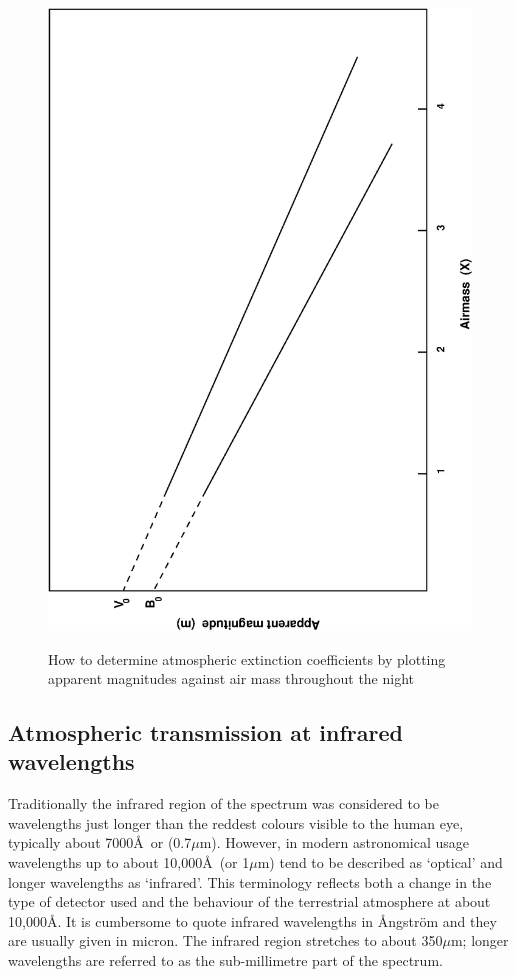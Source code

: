\documentclass[twoside,11pt]{article}
\begin{document}
\begin{figure}[htbp]
   \centering 
   \includegraphics[totalheight=4.5in,angle=270]{sc6_airmass.ps}
   \begin{quote}
   \caption{How to determine atmospheric extinction coefficients by
    plotting apparent magnitudes against air mass throughout the night
   \label{AIRMASSP} }
   \end{quote}
\end{figure}

\subsection{\label{IRATMOS}Atmospheric transmission at infrared wavelengths}

Traditionally the infrared region of the spectrum was considered to be
wavelengths just longer than the reddest colours visible to the human
eye, typically about 7000\AA ~or (0.7$\mu$m).  However, in modern
astronomical usage wavelengths up to about 10,000\AA ~(or 1$\mu$m) tend
to be described as `optical' and longer wavelengths as `infrared'.  This
terminology reflects both a change in the type of detector used and the
behaviour of the terrestrial atmosphere at about 10,000\AA .  It is
cumbersome to quote infrared wavelengths in \AA ngstr\"{o}m and they are
usually given in micron.  The infrared region stretches to about 350$\mu$m;
longer wavelengths are referred to as the sub-millimetre part of the
spectrum.
\end{document}
